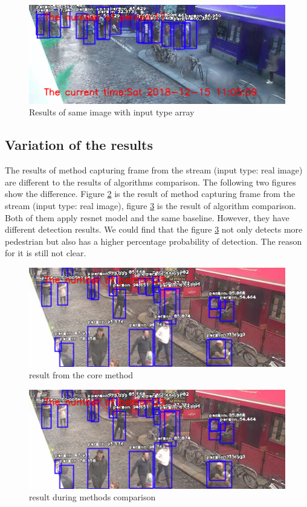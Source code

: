 \documentclass[runningheads]{llncs}
\begin{document}
\begin{figure}

	\includegraphics[width=\textwidth]{figs/problem_imgtype2.png}
	\caption{Results of same image with input type array} \label{fig2.2}
\end{figure}

\subsection{Variation of the results}
The results of method capturing frame from the stream (input type: real image) are different to the results of algorithms comparison. The following two figures show the difference. Figure \ref{fig3.1} is the result of method capturing frame from the stream (input type: real image), figure \ref{fig3.2} is the result of algorithm comparison. Both of them apply resnet model and the same baseline. However, they have different detection results. We could find that the figure \ref{fig3.2} not only detects more pedestrian but also has a higher percentage probability of detection. The reason for it is still not clear.  
\begin{figure}
\includegraphics[width=\textwidth]{figs/problem_variant2.png}
\caption{result from the core method} \label{fig3.1}
\end{figure}

\begin{figure}
	\includegraphics[width=\textwidth]{figs/problem_variant2.png}
	\caption{result during methods comparison} \label{fig3.2}
\end{figure}
\end{document}
